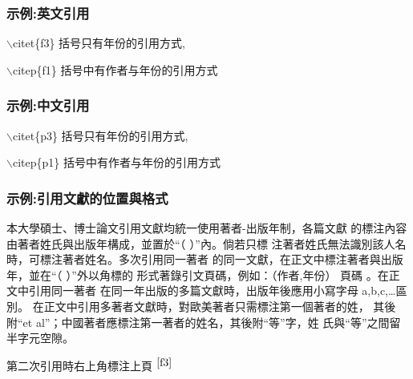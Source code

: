 \subsubsection{示例:英文引用}
$\backslash$citet\{f3\} 括号只有年份的引用方式,\citet{f3}\label{f3}

$\backslash$citep\{f1\} 括号中有作者与年份的引用方式\citep{f1}

\subsubsection{示例:中文引用}
$\backslash$citet\{p3\} 括号只有年份的引用方式,\citet{p3}\label{p1}

$\backslash$citep\{p1\} 括号中有作者与年份的引用方式\citep{p2}


\clearpage
\subsubsection{示例:引用文獻的位置與格式}
\par 本大學碩士、博士論文引用文獻均統一使用著者-出版年制，各篇文獻
的標注內容由著者姓氏與出版年構成，並置於“（ ）”內。倘若只標
注著者姓氏無法識別該人名時，可標注著者姓名。多次引用同一著者
的同一文獻，在正文中標注著者與出版年，並在“（ ）”外以角標的
形式著錄引文頁碼，例如：（作者,年份）
頁碼 。在正文中引用同一著者
在同一年出版的多篇文獻時，出版年後應用小寫字母 a,b,c,…區別。
在正文中引用多著者文獻時，對歐美著者只需標注第一個著者的姓，
其後附“et al”；中國著者應標注第一著者的姓名，其後附“等”字，姓
氏與“等”之間留半字元空隙。

第二次引用時右上角標注上頁 \citet{f3}$^{\pageref{f3}}$
